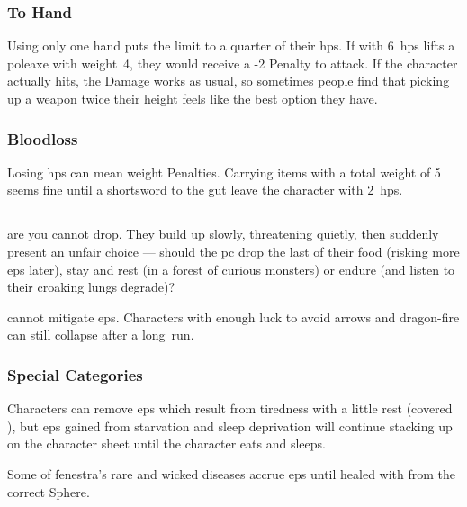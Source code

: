 \begin{multicols}{2}
\subsubsection{To Hand}
Using only one hand puts the limit to a quarter of their \glspl{hp}.
If  with 6~\glspl{hp} lifts a poleaxe with \gls{weight}~4, they would receive a -2 Penalty to attack.
If the character actually hits, the Damage works as usual, so sometimes people find that picking up a weapon twice their height feels like the best option they have.

\subsubsection{Bloodloss}

Losing \glspl{hp} can mean \Gls{weight} Penalties.
Carrying items with a total \gls{weight} of 5 seems fine until a shortsword to the gut leave the character with 2~\glspl{hp}.


\subsection{}
\label{ep}

 are  you cannot drop.
They build up slowly, threatening quietly, then suddenly present an unfair choice --- should the \gls{pc} drop the last of their food (risking more \glspl{ep} later), stay and rest (in a forest of curious monsters) or endure (and listen to their croaking lungs degrade)?

 cannot mitigate \glspl{ep}.
Characters with enough luck to avoid arrows and dragon-fire can still collapse after a long~run.

\subsubsection{Special Categories}

Characters can remove \glspl{ep} which result from tiredness with a little rest (covered ), but \glspl{ep} gained from starvation and sleep deprivation will continue stacking up on the character sheet until the character eats and sleeps.

Some of \gls{fenestra}'s rare and wicked diseases accrue \glspl{ep} until healed with  from the correct Sphere.

\end{multicols}

